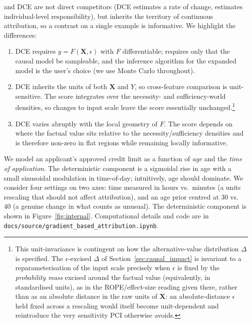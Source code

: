 \ourapproach and DCE are not direct competitors (DCE estimates a rate of
change, \ourapproach estimates individual-level responsibility), but
\ourapproach inherits the territory of continuous attribution, so a contrast
on a single example is informative. We highlight the differences:
\begin{enumerate}
\item DCE requires $y=F(\mathbf{X},\epsilon)$ with $F$ differentiable;
  \ourapproach requires only that the causal model be sampleable, and the
  inference algorithm for the expanded model is the user's choice (we use Monte
  Carlo throughout).
\item DCE inherits the units of both $\mathbf{X}$ and $Y$, so cross-feature
  comparison is unit-sensitive. The \ourapproach score integrates over the
  necessity- and sufficiency-world densities, so changes to input scale leave
  the score essentially unchanged.\footnote{This unit-invariance is contingent
  on how the alternative-value distribution $\Delta$ is specified. The
  $\epsilon$-excised $\Delta$ of Section~\ref{sec:causal_impact} is invariant to
  a reparameterisation of the input scale precisely when $\epsilon$ is fixed by
  the \emph{probability mass} excised around the factual value (equivalently, in
  standardised units), as in the ROPE/effect-size reading given there, rather
  than as an absolute distance in the raw units of $\mathbf{X}$: an
  absolute-distance $\epsilon$ held fixed across a rescaling would itself become
  unit-dependent and reintroduce the very sensitivity PCI otherwise avoids.}
\item DCE varies abruptly with the local geometry of $F$. The \ourapproach
  score depends on where the factual value sits relative to the
  necessity/sufficiency densities and is therefore non-zero in flat regions
  while remaining locally informative.
\end{enumerate}

\begin{example}\label{ex:age}
We model an applicant's approved credit limit as a function of \emph{age} and
the \emph{time of application}. The deterministic component is a sigmoidal
rise in age with a small sinusoidal modulation in time-of-day; intuitively,
age should dominate. We consider four settings on two axes: time measured in
hours vs.\ minutes (a units rescaling that should not affect attribution), and
an age prior centred at $30$ vs.\ $40$ (a genuine change in what counts as
unusual). The deterministic component is shown in
Figure~\ref{fig:internal}. Computational details and code are in
\texttt{docs/source/gradient\_based\_attribution.ipynb}.
\end{example}

